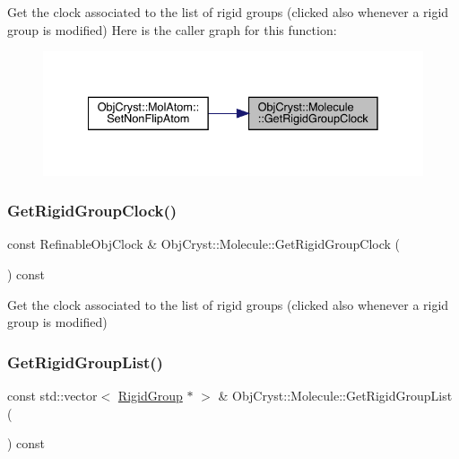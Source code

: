 Get the clock associated to the list of rigid groups (clicked also whenever a rigid group is modified) Here is the caller graph for this function\+:
\nopagebreak
\begin{figure}[H]
\begin{center}
\leavevmode
\includegraphics[width=335pt]{class_obj_cryst_1_1_molecule_a6f7aea0410adabd5e0159d082feefe72_icgraph}
\end{center}
\end{figure}
\mbox{\label{class_obj_cryst_1_1_molecule_a32b58e8e7ed93cf444f36f72cb6607a3}} 
\subsubsection{\texorpdfstring{GetRigidGroupClock()}{GetRigidGroupClock()}\hspace{0.1cm}{\footnotesize\ttfamily [2/2]}}
{\footnotesize\ttfamily const Refinable\+Obj\+Clock \& Obj\+Cryst\+::\+Molecule\+::\+Get\+Rigid\+Group\+Clock (\begin{DoxyParamCaption}{ }\end{DoxyParamCaption}) const}

Get the clock associated to the list of rigid groups (clicked also whenever a rigid group is modified) \mbox{\label{class_obj_cryst_1_1_molecule_a58771b4ff0139164760b7310ee2e1837}} 
\subsubsection{\texorpdfstring{GetRigidGroupList()}{GetRigidGroupList()}\hspace{0.1cm}{\footnotesize\ttfamily [1/2]}}
{\footnotesize\ttfamily const std\+::vector$<$ \mbox{\hyperlink{class_obj_cryst_1_1_rigid_group}{Rigid\+Group}} $\ast$ $>$ \& Obj\+Cryst\+::\+Molecule\+::\+Get\+Rigid\+Group\+List (\begin{DoxyParamCaption}{ }\end{DoxyParamCaption}) const}

